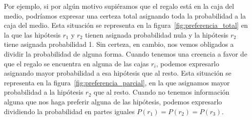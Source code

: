\documentclass[a4paper,11pt]{book}
\theoremstyle{definition}
\begin{document}
Por ejemplo, si por alg\'un motivo supi\'eramos que el regalo est\'a en la caja del medio, podr\'iamos expresar una certeza total asignando toda la probabilidad a la caja del medio.
%
Esta situaci\'on se representa en la figura~\ref{fig:preferencia_total} en la que las hip\'otesis $r_1$ y $r_2$ tienen asignada probabilidad nula y la hip\'otesis $r_2$ tiene asignada probabilidad 1.
%
Sin certeza, en cambio, nos vemos obligados a dividir la probabilidad de alguna forma.
%
Cuando tenemos una creencia a favor de que el regalo se encuentra en alguna de las cajas $r_i$, podemos expresarlo asignando mayor probabilidad a esa hip\'otesis que al resto.
%
Esta situaci\'on se representa en la figura~\ref{fig:preferencia_parcial}, en la que asignamos mayor probabilidad a la hip\'otesis $r_2$ que al resto.
%
Cuando no tenemos informaci\'on alguna que nos haga preferir alguna de las hip\'otesis, podemos expresarlo dividiendo la probabilidad en partes iguales $P(r_1) = P(r_2) = P(r_3)$.
%
\end{document}
